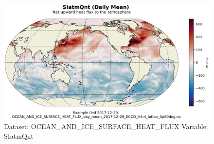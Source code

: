 \begin{figure}[H]
\centering
\includegraphics[scale=0.55]{../images/plots/latlon_plots/Ocean_and_Sea-Ice_Surface_Heat_Fluxes/SIatmQnt.png}
\caption{Dataset: OCEAN\_AND\_ICE\_SURFACE\_HEAT\_FLUX Variable: SIatmQnt}
\label{tab:table-OCEAN_AND_ICE_SURFACE_HEAT_FLUX_SIatmQnt-Plot}
\end{figure}
\pagebreak
